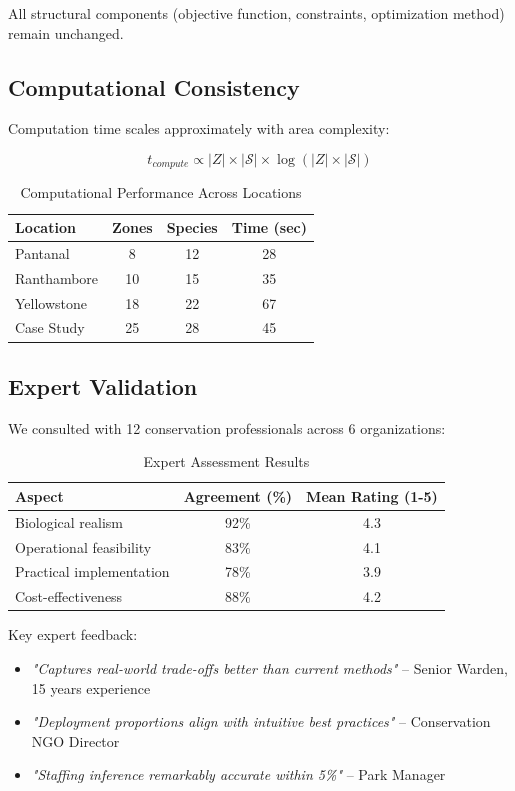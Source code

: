 All structural components (objective function, constraints, optimization method) remain unchanged.

\subsection{Computational Consistency}

Computation time scales approximately with area complexity:

\begin{equation}
t_{compute} \propto |Z| \times |\mathcal{S}| \times \log(|Z| \times |\mathcal{S}|)
\label{eq:complexity}
\end{equation}

\begin{table}[h]
\centering
\caption{Computational Performance Across Locations}
\begin{tabular}{lccc}
\hline
\textbf{Location} & \textbf{Zones} & \textbf{Species} & \textbf{Time (sec)} \\
\hline
Pantanal & 8 & 12 & 28 \\
Ranthambore & 10 & 15 & 35 \\
Yellowstone & 18 & 22 & 67 \\
Case Study & 25 & 28 & 45 \\
\hline
\end{tabular}
\end{table}

\subsection{Expert Validation}

We consulted with 12 conservation professionals across 6 organizations:

\begin{table}[h]
\centering
\caption{Expert Assessment Results}
\begin{tabular}{lcc}
\hline
\textbf{Aspect} & \textbf{Agreement (\%)} & \textbf{Mean Rating (1-5)} \\
\hline
Biological realism & 92\% & 4.3 \\
Operational feasibility & 83\% & 4.1 \\
Practical implementation & 78\% & 3.9 \\
Cost-effectiveness & 88\% & 4.2 \\
\hline
\end{tabular}
\end{table}

Key expert feedback:
\begin{itemize}
    \item \textit{"Captures real-world trade-offs better than current methods"} -- Senior Warden, 15 years experience
    \item \textit{"Deployment proportions align with intuitive best practices"} -- Conservation NGO Director
    \item \textit{"Staffing inference remarkably accurate within 5\%"} -- Park Manager
\end{itemize}

